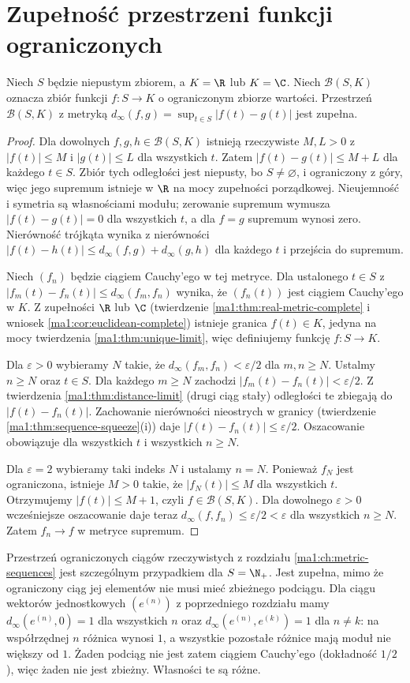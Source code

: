 \section{Zupełność przestrzeni funkcji ograniczonych}
\begin{twierdzenie}
\label{ma1:thm:bounded-functions-complete}
Niech $S$ będzie niepustym zbiorem, a $K=\R$ lub $K=\C$. Niech $\mathcal B(S,K)$ oznacza zbiór funkcji $f:S\to K$ o ograniczonym zbiorze wartości. Przestrzeń $\mathcal B(S,K)$ z metryką
$d_\infty(f,g)=\sup_{t\in S}|f(t)-g(t)|$ jest zupełna.
\end{twierdzenie}
\begin{proof}
Dla dowolnych $f,g,h\in\mathcal B(S,K)$ istnieją rzeczywiste $M,L>0$ z $|f(t)|\le M$ i $|g(t)|\le L$ dla wszystkich $t$. Zatem $|f(t)-g(t)|\le M+L$ dla każdego $t\in S$. Zbiór tych odległości jest niepusty, bo $S\ne\varnothing$, i ograniczony z góry, więc jego supremum istnieje w $\R$ na mocy zupełności porządkowej. Nieujemność i symetria są własnościami modułu; zerowanie supremum wymusza $|f(t)-g(t)|=0$ dla wszystkich $t$, a dla $f=g$ supremum wynosi zero. Nierówność trójkąta wynika z nierówności $|f(t)-h(t)|\le d_\infty(f,g)+d_\infty(g,h)$ dla każdego $t$ i przejścia do supremum.

Niech $(f_n)$ będzie ciągiem Cauchy'ego w tej metryce. Dla ustalonego $t\in S$ z $|f_m(t)-f_n(t)|\le d_\infty(f_m,f_n)$ wynika, że $(f_n(t))$ jest ciągiem Cauchy'ego w $K$. Z zupełności $\R$ lub $\C$ (twierdzenie \ref{ma1:thm:real-metric-complete} i wniosek \ref{ma1:cor:euclidean-complete}) istnieje granica $f(t)\in K$, jedyna na mocy twierdzenia \ref{ma1:thm:unique-limit}, więc definiujemy funkcję $f:S\to K$.

Dla $\varepsilon>0$ wybieramy $N$ takie, że $d_\infty(f_m,f_n)<\varepsilon/2$ dla $m,n\ge N$. Ustalmy $n\ge N$ oraz $t\in S$. Dla każdego $m\ge N$ zachodzi $|f_m(t)-f_n(t)|<\varepsilon/2$. Z twierdzenia \ref{ma1:thm:distance-limit} (drugi ciąg stały) odległości te zbiegają do $|f(t)-f_n(t)|$. Zachowanie nierówności nieostrych w granicy (twierdzenie \ref{ma1:thm:sequence-squeeze}(i)) daje $|f(t)-f_n(t)|\le\varepsilon/2$. Oszacowanie obowiązuje dla wszystkich $t$ i wszystkich $n\ge N$.

Dla $\varepsilon=2$ wybieramy taki indeks $N$ i ustalamy $n=N$. Ponieważ $f_N$ jest ograniczona, istnieje $M>0$ takie, że $|f_N(t)|\le M$ dla wszystkich $t$. Otrzymujemy $|f(t)|\le M+1$, czyli $f\in\mathcal B(S,K)$. Dla dowolnego $\varepsilon>0$ wcześniejsze oszacowanie daje teraz $d_\infty(f,f_n)\le\varepsilon/2<\varepsilon$ dla wszystkich $n\ge N$. Zatem $f_n\to f$ w metryce supremum.
\end{proof}
Przestrzeń ograniczonych ciągów rzeczywistych z rozdziału \ref{ma1:ch:metric-sequences} jest szczególnym przypadkiem dla $S=\N_+$. Jest zupełna, mimo że ograniczony ciąg jej elementów nie musi mieć zbieżnego podciągu. Dla ciągu wektorów jednostkowych $(e^{(n)})$ z poprzedniego rozdziału mamy $d_\infty(e^{(n)},0)=1$ dla wszystkich $n$ oraz $d_\infty(e^{(n)},e^{(k)})=1$ dla $n\ne k$: na współrzędnej $n$ różnica wynosi $1$, a wszystkie pozostałe różnice mają moduł nie większy od $1$. Żaden podciąg nie jest zatem ciągiem Cauchy'ego (dokładność $1/2$), więc żaden nie jest zbieżny. Własności te są różne.

